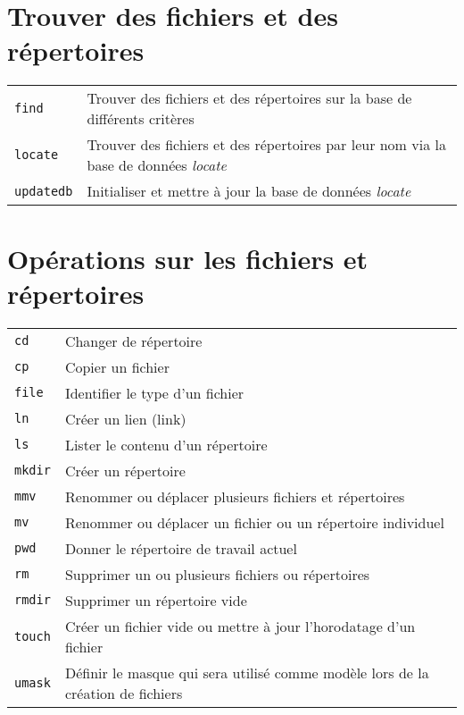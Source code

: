 \documentclass[10pt,a4paper]{article}
\begin{document}
\begin{multicols}{2}
\vfill

\section{Trouver des fichiers et des répertoires}
\begin{tabular}{ p{2.5cm} p{8.5cm} }
  \hline
  \texttt{find} & Trouver des fichiers et des répertoires sur la base de différents critères \\
  \rowcolor{Gray}
  \texttt{locate} &  Trouver des fichiers et des répertoires par leur nom via la base de données \textit{locate}\\
  \texttt{updatedb} & Initialiser et mettre à jour la base de données \textit{locate}\\
  \hline
\end{tabular}

\columnbreak

\section{Opérations sur les fichiers et répertoires}
\begin{tabular}{ p{2.5cm} p{8.5cm} }
  \hline
  \texttt{cd} & Changer de répertoire \\
  \rowcolor{Gray}
  \texttt{cp} & Copier un fichier \\
  \texttt{file} & Identifier le type d'un fichier\\
  \rowcolor{Gray}
  \texttt{ln} & Créer un lien (link)\\
  \texttt{ls} & Lister le contenu d'un répertoire\\
  \rowcolor{Gray}
  \texttt{mkdir} & Créer un répertoire\\
  \texttt{mmv} & Renommer ou déplacer plusieurs fichiers et répertoires \\
  \rowcolor{Gray}
  \texttt{mv} & Renommer ou déplacer un fichier ou un répertoire individuel \\
  \texttt{pwd} & Donner le répertoire de travail actuel \\
  \rowcolor{Gray}
  \texttt{rm} & Supprimer un ou plusieurs fichiers ou répertoires \\
  \texttt{rmdir} & Supprimer un répertoire vide \\
  \rowcolor{Gray}
  \texttt{touch} & Créer un fichier vide ou mettre à jour l'horodatage d'un fichier \\
  \texttt{umask} & Définir le masque qui sera utilisé comme modèle lors de la création de fichiers\\
  \hline
\end{tabular}


\end{multicols}
\end{document}
